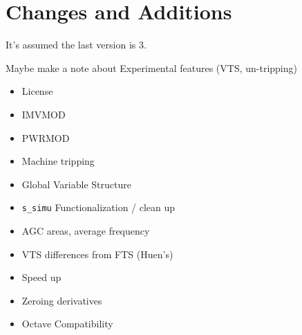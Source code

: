 \chapter{Changes and Additions}
It's assumed the last version is 3.


Maybe make a note about Experimental features (VTS, un-tripping)

\begin{itemize}
\item License
\item IMVMOD
\item PWRMOD
\item Machine tripping
\item Global Variable Structure
\item \verb|s_simu| Functionalization / clean up
\item AGC
\subitem areas, average frequency
\item VTS
\subitem differences from FTS (Huen's)
\item Speed up
\item Zeroing derivatives
\item Octave Compatibility
\end{itemize}